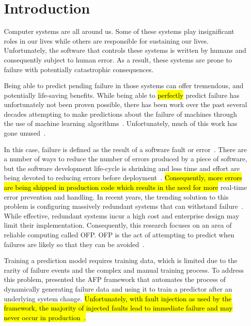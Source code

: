 \section{Introduction} \label{chapter1}
Computer systems are all around us.  Some of these systems play insignificant
roles in our lives while others are responsible for sustaining our lives.
Unfortunately, the software that controls these systems is written by humans
and consequently subject to human error.  As a result, these systems are prone
to failure with potentially catastrophic consequences.  

Being able to predict pending failure in those systems can offer tremendous,
and potentially life-saving benefits.  While being able to \hl{perfectly}
predict failure has unfortunately not been proven possible, there has been work
over the past several decades attempting to make predictions about the failure
of machines through the use of machine learning
algorithms~\citep{salfnerSurvey}.  Unfortunately, much of this work has gone
unused~\citep{irrera2015}.  

In this case, failure is defined as the result of a software fault or
error~\citep{salfnerSurvey}.  There are a number of ways to reduce the number
of errors produced by a piece of software, but the software development
life-cycle is shrinking and less time and effort are being devoted to reducing
errors before deployment~\citep{schmidt2016}.  \hl{Consequently, more errors
are being shipped in production code which results in the need for more}
real-time error prevention and handling.  In recent years, the trending
solution to this problem is configuring massively redundant systems that can
withstand failure~\citep{bauer2012}.  While effective, redundant systems incur
a high cost and enterprise design may limit their implementation.
Consequently, this research focuses on an area of reliable computing called
\ac{OFP}.  \ac{OFP} is the act of attempting to predict when failures are
likely so that they can be avoided~\citep{salfnerSurvey}.  

Training a prediction model requires training data, which is limited due to the
rarity of failure events and the complex and manual training process.  To
address this problem, \citet{irrera2015} presented the \ac{AFP} framework that
automates the process of dynamically generating failure data and using it to
train a predictor after an underlying system change.  \hl{Unfortunately, with
fault injection as used by the framework, the majority of injected faults lead
to immediate failure and may never occur in
production~\citep{kikuchi2014,natella2016assessing}.}

